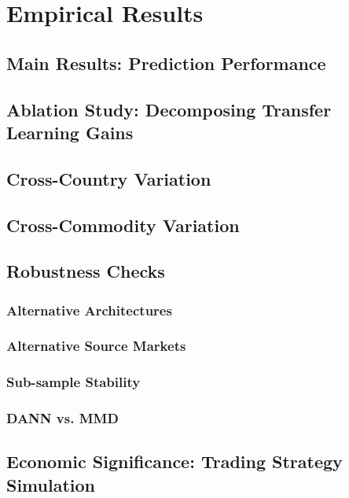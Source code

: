 
\section{Empirical Results} \label{sec: results}
\subsection{Main Results: Prediction Performance} \label{subsec: results_main results}
\subsection{Ablation Study: Decomposing Transfer Learning Gains} \label{subsec: results_ablation study}
\subsection{Cross-Country Variation} \label{subsec: results_cross country}
\subsection{Cross-Commodity Variation} \label{subsec: results_cross-commodity variation} 
\subsection{Robustness Checks} \label{subsec: results_robustness checks}
\subsubsection{Alternative Architectures} \label{subsubsec: results_alternative architectures}
\subsubsection{Alternative Source Markets} \label{subsubsec: results_alternative source markets}
\subsubsection{Sub-sample Stability} \label{subsubsec: results_sub-sample stability}
\subsubsection{DANN vs. MMD} \label{subsubsec: results_dann vs mmd}
\subsection{Economic Significance: Trading Strategy Simulation} \label{subsec: results_economic significance}
\newpage